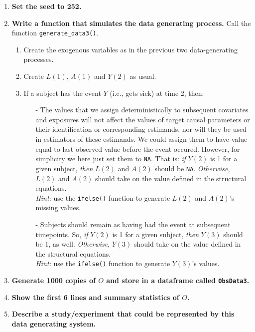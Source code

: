 \documentclass{exam}
\begin{document}
\begin{enumerate}
\item \textbf{Set the seed to 252.}
\item \textbf{Write a function that simulates the data generating process.} Call the function \texttt{generate\_data3()}.
\begin{enumerate}
\item Create the exogenous variables as in the previous two data-generating processes.
\item Create $L(1)$, $A(1)$ and $Y(2)$ as usual.
\item If a subject has the event $Y$ (i.e., gets sick) at time 2, then:
\begin{itemize}
\item[-] The values that we assign deterministically to subsequent covariates and exposures  will not affect the values of target causal parameters or their identification or corresponding estimands, nor will they be used in estimators of these estimands. We could assign them to have value equal to last observed value before the event occured. However, for simplicity we here just set them to \texttt{NA}. That is: \textit{if} $Y(2)$ is 1 for a given subject,  \textit{then} $L(2)$ and $A(2)$ should be \texttt{NA}. \textit{Otherwise}, $L(2)$ and $A(2)$ should take on the value defined in the structural equations.\\
\emph{Hint:} use the \texttt{ifelse()} function to generate $L(2)$ and $A(2)$'s missing values.
\item[-] Subjects should remain as having had the event at subsequent timepoints. So, \textit{if} $Y(2)$ is 1 for a given subject, \textit{then} $Y(3)$ should be 1, as well. \textit{Otherwise}, $Y(3)$ should take on the value defined in the structural equations. \\
\emph{Hint:} use the \texttt{ifelse()} function to generate $Y(3)$'s values.
\end{itemize}
\end{enumerate}
\item \textbf{Generate 1000 copies of $O$ and store in a dataframe called \texttt{ObsData3}.}
\item \textbf{Show the first 6 lines and summary statistics of $O$.}
\item \textbf{Describe a study/experiment that could be represented by this data generating system.}
\end{enumerate}
\end{document}
